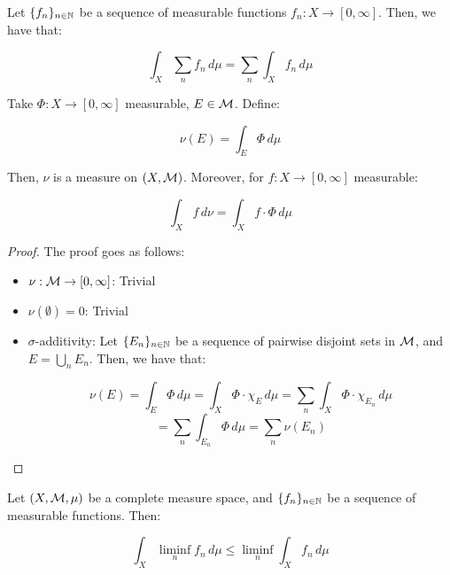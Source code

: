 \vspace{1em}

\begin{fcorollary}
    Let $\{f_n\}_{n \in \mathbb{N}}$ be a sequence of measurable functions $f_n: X \to [0, \infty]$.
    Then, we have that:

    $$\int_{X} \sum_{n} f_n \, d\mu = \sum_{n} \int_{X} f_n \, d\mu$$
    
\end{fcorollary}

\vspace{1em}

\begin{fproposition}
    Take $\Phi: X \to [0, \infty]$ measurable, $E \in \mathcal{M}$. Define:

    $$\nu(E) = \int_{E} \Phi \, d\mu$$

    Then, $\nu$ is a measure on $(X, \mathcal{M})$. Moreover, for $f: X \to [0, \infty]$ measurable:

    $$\int_{X} f \, d\nu = \int_{X} f \cdot \Phi \, d\mu$$

\end{fproposition}

\begin{proof}

    The proof goes as follows:

    \begin{itemize}
        \item $\nu: \mathcal{M} \to [0, \infty]$: Trivial
        
        \item $\nu(\emptyset) = 0$: Trivial
        
        \item $\sigma$-additivity: Let $\{E_n\}_{n \in \mathbb{N}}$ be a sequence of pairwise disjoint sets in $\mathcal{M}$,
        and $E = \bigcup_{n} E_n$. Then, we have that:

        $$\nu(E) = \int_{E} \Phi \, d\mu = \int_{X} \Phi \cdot \chi_E \, d\mu = \sum_{n} \int_{X} \Phi \cdot \chi_{E_n} \, d\mu$$
        $$= \sum_{n} \int_{E_n} \Phi \, d\mu = \sum_{n} \nu(E_n)$$
    \end{itemize}

\end{proof}

\begin{flemma}[Fatou]
    Let $(X, \mathcal{M}, \mu)$ be a complete measure space, and 
    $\{f_n\}_{n \in \mathbb{N}}$ be a sequence of measurable functions. Then:

    $$\int_{X} \liminf_{n} f_n \, d\mu \leq \liminf_{n} \int_{X} f_n \, d\mu$$
\end{flemma}

